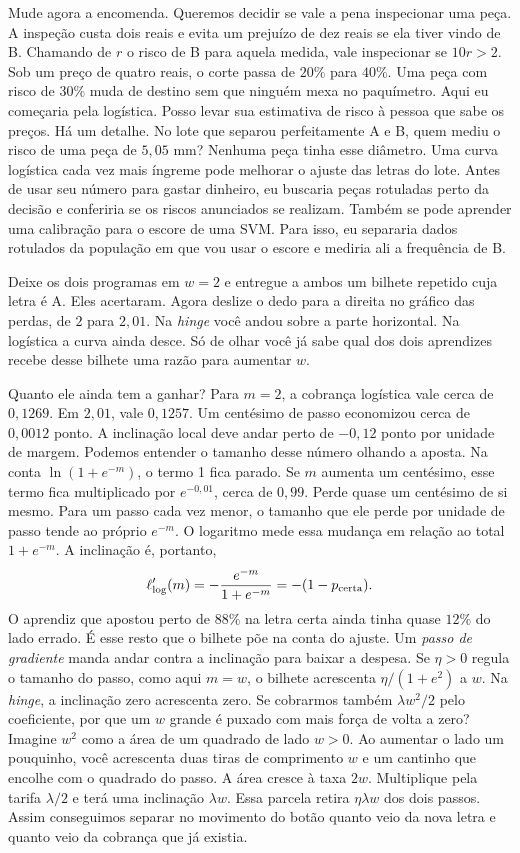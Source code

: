Mude agora a encomenda. Queremos decidir se vale a pena inspecionar uma peça. A inspeção custa dois reais e evita um prejuízo de dez reais se ela tiver vindo de B. Chamando de $r$ o risco de B para aquela medida, vale inspecionar se $10r>2$. Sob um preço de quatro reais, o corte passa de $20\%$ para $40\%$. Uma peça com risco de $30\%$ muda de destino sem que ninguém mexa no paquímetro. Aqui eu começaria pela logística. Posso levar sua estimativa de risco à pessoa que sabe os preços. Há um detalhe. No lote que separou perfeitamente A e B, quem mediu o risco de uma peça de $5{,}05$ mm? Nenhuma peça tinha esse diâmetro. Uma curva logística cada vez mais íngreme pode melhorar o ajuste das letras do lote. Antes de usar seu número para gastar dinheiro, eu buscaria peças rotuladas perto da decisão e conferiria se os riscos anunciados se realizam. Também se pode aprender uma calibração para o escore de uma SVM. Para isso, eu separaria dados rotulados da população em que vou usar o escore e mediria ali a frequência de B.

Deixe os dois programas em $w=2$ e entregue a ambos um bilhete repetido cuja letra é A. Eles acertaram. Agora deslize o dedo para a direita no gráfico das perdas, de $2$ para $2{,}01$. Na \emph{hinge} você andou sobre a parte horizontal. Na logística a curva ainda desce. Só de olhar você já sabe qual dos dois aprendizes recebe desse bilhete uma razão para aumentar $w$.

Quanto ele ainda tem a ganhar? Para $m=2$, a cobrança logística vale cerca de $0{,}1269$. Em $2{,}01$, vale $0{,}1257$. Um centésimo de passo economizou cerca de $0{,}0012$ ponto. A inclinação local deve andar perto de $-0{,}12$ ponto por unidade de margem. Podemos entender o tamanho desse número olhando a aposta. Na conta $\ln(1+e^{-m})$, o termo 1 fica parado. Se $m$ aumenta um centésimo, esse termo fica multiplicado por $e^{-0{,}01}$, cerca de $0{,}99$. Perde quase um centésimo de si mesmo. Para um passo cada vez menor, o tamanho que ele perde por unidade de passo tende ao próprio $e^{-m}$. O logaritmo mede essa mudança em relação ao total $1+e^{-m}$. A inclinação é, portanto,
\[
 \ell'_{\rm log}(m)=-\frac{e^{-m}}{1+e^{-m}}=-(1-p_{\rm certa}).
\]
O aprendiz que apostou perto de $88\%$ na letra certa ainda tinha quase $12\%$ do lado errado. É esse resto que o bilhete põe na conta do ajuste. Um \emph{passo de gradiente} manda andar contra a inclinação para baixar a despesa. Se $\eta>0$ regula o tamanho do passo, como aqui $m=w$, o bilhete acrescenta $\eta/(1+e^2)$ a $w$. Na \emph{hinge}, a inclinação zero acrescenta zero. Se cobrarmos também $\lambda w^2/2$ pelo coeficiente, por que um $w$ grande é puxado com mais força de volta a zero? Imagine $w^2$ como a área de um quadrado de lado $w>0$. Ao aumentar o lado um pouquinho, você acrescenta duas tiras de comprimento $w$ e um cantinho que encolhe com o quadrado do passo. A área cresce à taxa $2w$. Multiplique pela tarifa $\lambda/2$ e terá uma inclinação $\lambda w$. Essa parcela retira $\eta\lambda w$ dos dois passos. Assim conseguimos separar no movimento do botão quanto veio da nova letra e quanto veio da cobrança que já existia.

